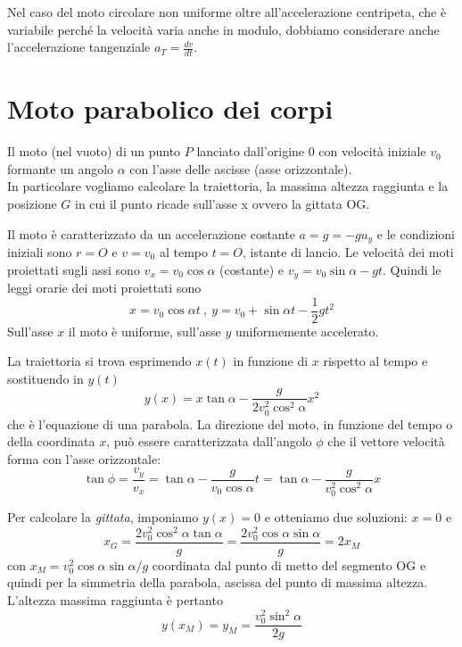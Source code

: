 \documentclass[class=book, crop=false, oneside, 12pt]{standalone}
\begin{document}
Nel caso del moto circolare non uniforme oltre all'accelerazione centripeta, che è variabile perché la velocità varia anche in modulo, dobbiamo considerare anche l'accelerazione tangenziale \(a_T = \frac{dv}{dt} \).

\section{Moto parabolico dei corpi}

Il moto (nel vuoto) di un punto \(P\) lanciato dall'origine \(0\) con velocità iniziale \(v_0\) formante un angolo \(\alpha\) con l'asse delle ascisse (asse orizzontale).\\
In particolare vogliamo calcolare la traiettoria, la massima altezza raggiunta e la posizione \(G\) in cui il punto ricade sull'asse x ovvero la gittata OG.

Il moto è caratterizzato da un accelerazione costante \(a = g = -g u_y\) e le condizioni iniziali sono \(r = O\) e \(v = v_0\) al tempo \(t = O\), istante di lancio.
Le velocità dei moti proiettati sugli assi sono \(v_x = v_0 \cos \alpha\) (costante) e \(v_y = v_0 \sin \alpha - g t\).
Quindi le leggi orarie dei moti proiettati sono
\begin{equation}
  x = v_0 \cos \alpha t \ , \ y = v_0 + \sin \alpha t - \frac{1}{2} g t^2
\end{equation}
Sull'asse \(x\) il moto è uniforme, sull'asse \(y\) uniformemente accelerato.

La traiettoria si trova esprimendo \(x(t)\) in funzione di \(x\) rispetto al tempo e sostituendo in \(y(t)\)
\begin{equation}
  y(x) = x \tan \alpha - \frac{g}{2 v_0^2 \cos^2 \alpha} x^2
\end{equation}
che è l'equazione di una parabola.
La direzione del moto, in funzione del tempo o della coordinata \(x\), può essere caratterizzata dall'angolo \(\phi\) che il vettore velocità forma con l'asse orizzontale:
\begin{equation}
  \tan \phi = \frac{v_y}{v_x} = \tan \alpha - \frac{g}{v_0 \cos \alpha} t = \tan \alpha - \frac{g}{v_0^2 \cos^2 \alpha} x
\end{equation}

Per calcolare la \emph{gittata}, imponiamo \(y(x) = 0\) e otteniamo due soluzioni: \(x=0\) e
\begin{equation}
  x_{G}=\frac{2 v_{0}^{2} \cos ^{2} \alpha \tan \alpha}{g}=\frac{2 v_{0}^{2} \cos \alpha \sin \alpha}{g}=2 x_{M}
\end{equation}
con \(x_M = v_0^2 \cos \alpha \sin \alpha / g\) coordinata dal punto di metto del segmento OG e quindi per la simmetria della parabola, ascissa del punto di massima altezza.
L'altezza massima raggiunta è pertanto
\begin{equation}
  y(x_M) = y_M = \frac{v_0^2 \sin^2 \alpha}{2g}
\end{equation}
\end{document}
